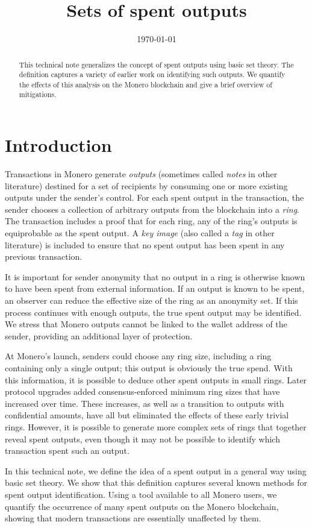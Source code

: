 \documentclass{mrl}
\title{Sets of spent outputs}
\date{\today}
\begin{document}
\begin{abstract}
This technical note generalizes the concept of spent outputs using basic set theory. The definition captures a variety of earlier work on identifying such outputs. We quantify the effects of this analysis on the Monero blockchain and give a brief overview of mitigations.
\end{abstract}

\section{Introduction}
Transactions in Monero generate \textit{outputs} (sometimes called \textit{notes} in other literature) destined for a set of recipients by consuming one or more existing outputs under the sender's control. For each spent output in the transaction, the sender chooses a collection of arbitrary outputs from the blockchain into a \textit{ring}. The transaction includes a proof that for each ring, any of the ring's outputs is equiprobable as the spent output. A \textit{key image} (also called a \textit{tag} in other literature) is included to ensure that no spent output has been spent in any previous transaction.

It is important for sender anonymity that no output in a ring is otherwise known to have been spent from external information. If an output is known to be spent, an observer can reduce the effective size of the ring as an anonymity set. If this process continues with enough outputs, the true spent output may be identified. We stress that Monero outputs cannot be linked to the wallet address of the sender, providing an additional layer of protection.

At Monero's launch, senders could choose any ring size, including a ring containing only a single output; this output is obviously the true spend. With this information, it is possible to deduce other spent outputs in small rings. Later protocol upgrades added consensus-enforced minimum ring sizes that have increased over time. These increases, as well as a transition to outputs with confidential amounts, have all but eliminated the effects of these early trivial rings. However, it is possible to generate more complex sets of rings that together reveal spent outputs, even though it may not be possible to identify which transaction spent such an output.

In this technical note, we define the idea of a spent output in a general way using basic set theory. We show that this definition captures several known methods for spent output identification. Using a tool available to all Monero users, we quantify the occurrence of many spent outputs on the Monero blockchain, showing that modern transactions are essentially unaffected by them.
\end{document}
